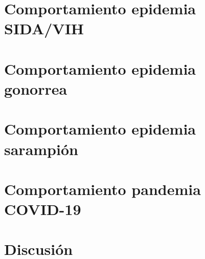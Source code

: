 
\section{Comportamiento epidemia SIDA/VIH}

\section{Comportamiento epidemia gonorrea}

\section{Comportamiento epidemia sarampión}

\section{Comportamiento pandemia COVID-19}

\section{Discusión}

